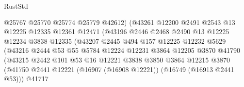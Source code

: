 \begin{lexlean}{RustStd}
\begin{coremodule}
                                  @25767
                                  @25770
                                  @25774
                                  @25779
                                  @42612)
                                (@43261
                                  @12200
                                  @2491
                                  @2543
                                  @13
                                  @12225
                                  @12335
                                  @12361
                                  @12471
                                  (@43196
                                    @2446
                                    @2468
                                    @2490
                                    @13
                                    @12225
                                    @12234
                                    @3838
                                    @12335
                                    (@43207
                                      @2445
                                      @494
                                      @157
                                      @12225
                                      @12232
                                      @5629
                                      (@43216
                                        @2444
                                        @53
                                        @55
                                        @5784
                                        @12224
                                        @12231
                                        @3864
                                        @12205
                                        @3870
                                        @41790
                                        (@43215
                                          @2442
                                          @101
                                          @53
                                          @16
                                          @12221
                                          @3838
                                          @3850
                                          @3864
                                          @12215
                                          @3870
                                          (@41750
                                            @2441
                                            @12221
                                            (@16907 (@16908 @12221))
                                            (@16749 (@16913 @2441 @53)))
                                          @41717

\end{coremodule}
\end{lexlean}
